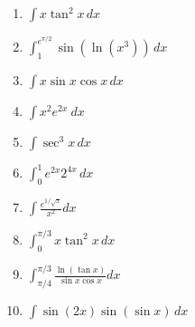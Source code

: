 \documentclass[letterpaper]{article}
\begin{document}
\begin{enumerate}
\begin{enumerate}
	\item $\int x \tan^2 x\,dx$

	\item $\int_1^{e^{\pi/2}} \sin (\ln (x^3))\,dx$

	\item $\int x \sin x \cos x\,dx$

	\item $\int x^2 e^{2x}~dx$

	\item $\int \sec^3 x\,dx$

	\item $\int_0^1 e^{2x}2^{4x}\,dx$

	\item $\int \frac{e^{1/\sqrt{x}}}{x^2}dx$

	\item $\int_0^{\pi/3} x\tan^2 x\,dx$

	\item $\int_{\pi/4}^{\pi/3} \frac{\ln(\tan x)}{\sin x \cos x}dx$

	\item $\int \sin(2x)\sin(\sin x)\,dx$
	\end{enumerate}


\end{enumerate}
\end{document}
